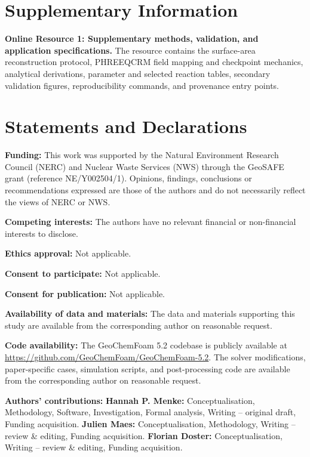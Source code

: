 \documentclass[pdflatex,sn-basic]{sn-jnl}
\begin{document}
\section*{Supplementary Information}

\textbf{Online Resource 1: Supplementary methods, validation, and application
specifications.} The resource contains the surface-area reconstruction
protocol, PHREEQCRM field mapping and checkpoint mechanics, analytical
derivations, parameter and selected reaction tables, secondary validation
figures, reproducibility commands, and provenance entry points.

\backmatter



\section*{Statements and Declarations}

\textbf{Funding:} This work was supported by the Natural Environment Research
Council (NERC) and Nuclear Waste Services (NWS) through the GeoSAFE grant
(reference NE/Y002504/1). Opinions, findings, conclusions or recommendations
expressed are those of the authors and do not necessarily reflect the views
of NERC or NWS.

\textbf{Competing interests:} The authors have no relevant financial or
non-financial interests to disclose.

\textbf{Ethics approval:} Not applicable.

\textbf{Consent to participate:} Not applicable.

\textbf{Consent for publication:} Not applicable.

\textbf{Availability of data and materials:} The data and materials supporting
this study are available from the corresponding author on reasonable request.

\textbf{Code availability:} The GeoChemFoam 5.2 codebase is publicly available
at \url{https://github.com/GeoChemFoam/GeoChemFoam-5.2}. The solver modifications,
paper-specific cases, simulation scripts, and post-processing code are available
from the corresponding author on reasonable request.

\textbf{Authors' contributions:} \textbf{Hannah P. Menke:} Conceptualisation,
Methodology, Software, Investigation, Formal analysis, Writing -- original
draft, Funding acquisition. \textbf{Julien Maes:} Conceptualisation,
Methodology, Writing -- review \& editing, Funding acquisition.
\textbf{Florian Doster:} Conceptualisation, Writing -- review \& editing,
Funding acquisition.
\end{document}

